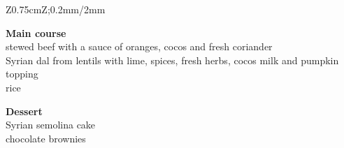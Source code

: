 \begin{landscape}
\begin{center}
\begin{tabular}{Z{0.75cm}Z{\socialEventBoxWidth};{0.2mm/2mm}}
\begin{minipage}[t]{\socialEventBoxWidth}
\begin{minipage}[t]{0.47\linewidth}
          \vspace{\socialEventSectionSep}
          \textbf{Main course}\\
          stewed beef with a sauce of oranges, cocos and fresh coriander\\
          Syrian dal from lentils with lime, spices, fresh herbs, cocos milk and pumpkin topping\\
          rice

          \textbf{Dessert}\\
          Syrian semolina cake\\
          chocolate brownies
        \end{minipage}
      \end{minipage}
      \vspace{0.4\multicolsep}
      \tabularnewline
    \end{tabular}
  \end{center}
  \newpage
\end{landscape}
\renewcommand{\arraystretch}{1.0}

